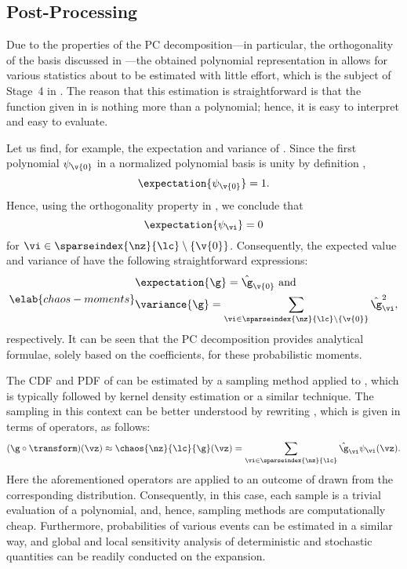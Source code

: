 \subsection{Post-Processing}

Due to the properties of the \ac{PC} decomposition---in particular, the
orthogonality of the basis discussed in ---the obtained
polynomial representation in  allows for various
statistics about \g to be estimated with little effort, which is the subject of
Stage~4 in . The reason that this estimation is
straightforward is that the function given in  is nothing
more than a polynomial; hence, it is easy to interpret and easy to evaluate.

Let us find, for example, the expectation and variance of \g. Since the first
polynomial $\psi_{\v{0}}$ in a normalized polynomial basis is unity by
definition \cite{xiu2010},
\[
  \expectation{\psi_{\v{0}}} = 1.
\]
Hence, using the orthogonality property in , we
conclude that
\[
  \expectation{\psi_{\vi}} = 0
\]
for $\vi \in \sparseindex{\nz}{\lc} \setminus \{ \v{0} \}$. Consequently, the
expected value and variance of \g have the following straightforward
expressions:
\begin{equation} \elab{chaos-moments}
  \begin{split}
    & \expectation{\g} = \hat{\g}_{\v{0}} \text{ and} \\
    & \variance{\g} = \sum_{\vi \in \sparseindex{\nz}{\lc} \setminus \{ \v{0} \}} \hat{\g}_{\vi}^2,
  \end{split}
\end{equation}
respectively. It can be seen that the \ac{PC} decomposition provides analytical
formulae, solely based on the coefficients, for these probabilistic moments.

The \ac{CDF} and \ac{PDF} of \g can be estimated by a sampling method applied to
, which is typically followed by kernel density estimation
\cite{hastie2013} or a similar technique. The sampling in this context can be
better understood by rewriting , which is given in terms
of operators, as follows:
\[
  (\g \circ \transform)(\vz) \approx \chaos{\nz}{\lc}{\g}(\vz)
  = \sum_{\vi \in \sparseindex{\nz}{\lc}} \hat{\g}_{\vi} \psi_{\vi}(\vz).
\]
Here the aforementioned operators are applied to an outcome of \vz drawn from
the corresponding distribution. Consequently, in this case, each sample is a
trivial evaluation of a polynomial, and, hence, sampling methods are
computationally cheap. Furthermore, probabilities of various events can be
estimated in a similar way, and global and local sensitivity analysis of
deterministic and stochastic quantities can be readily conducted on the
expansion.

